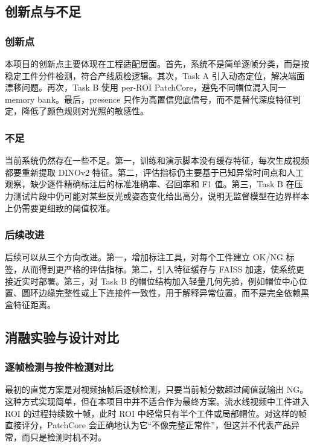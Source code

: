 \documentclass[12pt,hyperref,a4paper,UTF8,fontset=fandol]{ctexart}
\begin{document}
\subsection{创新点与不足}

\subsubsection{创新点}

本项目的创新点主要体现在工程适配层面。首先，系统不是简单逐帧分类，而是按稳定工件分件检测，符合产线质检逻辑。其次，Task A 引入动态定位，解决端面漂移问题。再次，Task B 使用 per-ROI PatchCore，避免不同帽位混入同一 memory bank。最后，presence 只作为高置信兜底信号，而不是替代深度特征判定，降低了颜色规则对光照的敏感性。

\subsubsection{不足}

当前系统仍然存在一些不足。第一，训练和演示脚本没有缓存特征，每次生成视频都要重新提取 DINOv2 特征。第二，评估指标仍主要基于已知异常时间点和人工观察，缺少逐件精确标注后的标准准确率、召回率和 F1 值。第三，Task B 在压力测试片段中仍可能对某些反光或姿态变化给出高分，说明无监督模型在边界样本上仍需要更细致的阈值校准。

\subsubsection{后续改进}

后续可以从三个方向改进。第一，增加标注工具，对每个工件建立 OK/NG 标签，从而得到更严格的评估指标。第二，引入特征缓存与 FAISS 加速，使系统更接近实时部署。第三，对 Task B 的帽位结构加入轻量几何先验，例如帽位中心位置、圆环边缘完整性或上下连接件一致性，用于解释异常位置，而不是完全依赖黑盒特征距离。

\newpage
\subsection{消融实验与设计对比}

\subsubsection{逐帧检测与按件检测对比}

最初的直觉方案是对视频抽帧后逐帧检测，只要当前帧分数超过阈值就输出 NG。这种方式实现简单，但在本项目中并不适合作为最终方案。流水线视频中工件进入 ROI 的过程持续数十帧，此时 ROI 中经常只有半个工件或局部帽位。对这样的帧直接评分，PatchCore 会正确地认为它“不像完整正常件”，但这并不代表产品异常，而只是检测时机不对。
\end{document}

